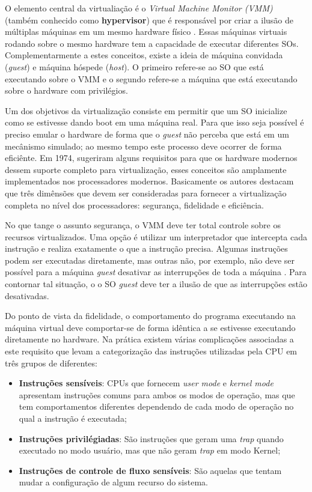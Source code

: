O elemento central da virtualiação é o \emph{Virtual Machine Monitor (VMM)}
(também conhecido como \textbf{hypervisor}) que é responsável por criar a
ilusão de múltiplas máquinas em um mesmo hardware físico \cite{tanenbaum}.
Essas máquinas virtuais rodando sobre o mesmo hardware tem a capacidade de
executar diferentes SOs. Complementarmente a estes conceitos, existe a ideia de
máquina convidada (\emph{guest}) e máquina hóspede (\emph{host}). O primeiro
refere-se ao SO que está executando sobre o VMM e o segundo refere-se a máquina
que está executando sobre o hardware com privilégios.

Um dos objetivos da virtualização consiste em permitir que um SO inicialize
como se estivesse dando boot em uma máquina real. Para que isso seja possível é
preciso emular o hardware de forma que o \emph{guest} não perceba que está em
um mecânismo simulado; ao mesmo tempo este processo deve ocorrer de forma
eficiênte. Em 1974, \citep{popek} sugeriram alguns requisitos para que os
hardware modernos dessem suporte completo para virtualização, esses conceitos
são amplamente implementados nos processadores modernos. Basicamente os autores
destacam que três dimênsões que devem ser consideradas para fornecer a
virtualização completa no nível dos processadores: segurança, fidelidade e
eficiência.

No que tange o assunto segurança, o VMM deve ter total controle sobre os
recursos virtualizados. Uma opção é utilizar um interpretador que intercepta
cada instrução e realiza exatamente o que a instrução precisa. Algumas
instruções podem ser executadas diretamente, mas outras não, por exemplo, não
deve ser possível para a máquina \emph{guest} desativar as interrupções de toda
a máquina \cite{tanenbaum}. Para contornar tal situação, o o SO \emph{guest}
deve ter a ilusão de que as interrupções estão desativadas.

Do ponto de vista da fidelidade, o comportamento do programa executando na
máquina virtual deve comportar-se de forma idêntica a se estivesse executando
diretamente no hardware. Na prática existem várias complicações associadas a
este requisito que levam a categorização das instruções utilizadas pela CPU em
três grupos de diferentes:

\begin{itemize}
  \item \textbf{Instruções sensíveis}: CPUs que fornecem \emph{user mode} e
        \emph{kernel mode} apresentam instruções comuns para ambos os modos de
        operação, mas que tem comportamentos diferentes dependendo de cada modo
        de operação no qual a instrução é executada;
  \item \textbf{Instruções privilégiadas}: São instruções que geram uma
        \emph{trap} quando executado no modo usuário, mas que não geram
        \emph{trap} em modo Kernel;
  \item \textbf{Instruções de controle de fluxo sensíveis}: São aquelas que
        tentam mudar a configuração de algum recurso do sistema.
\end{itemize}


